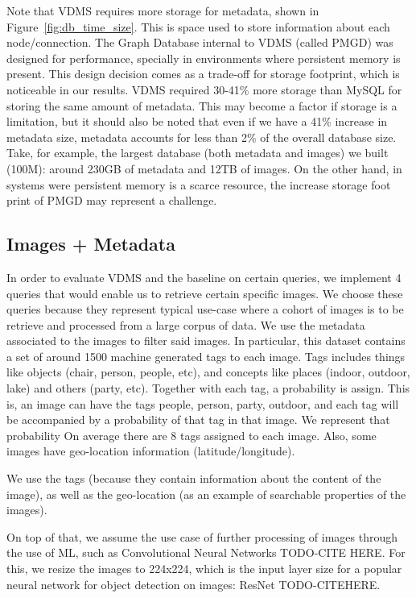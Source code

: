 Note that VDMS requires more storage for metadata, shown in
Figure~\ref{fig:db_time_size}.
This is space used to store information about each node/connection.
The Graph Database internal to VDMS (called PMGD) was designed for performance,
specially in environments where persistent memory is present.
This design decision comes as a trade-off for storage footprint, which is
noticeable in our results.
VDMS required 30-41\% more storage than MySQL for storing the same amount
of metadata.
This may become a factor if storage is a limitation, but it should also be noted
that even if we have a 41\% increase in metadata size,
metadata accounts for less than 2\% of the overall database size.
Take, for example, the largest database (both metadata and images) we built
(100M): around 230GB of metadata and 12TB of images.
On the other hand, in systems were persistent memory is a scarce resource,
the increase storage foot print of PMGD may represent a challenge.


\subsection{Images + Metadata}

In order to evaluate VDMS and the baseline on certain queries, we
implement 4 queries that would enable us to retrieve certain specific images.
We choose these queries because they represent typical use-case where a
cohort of images is to be retrieve and processed from a large corpus of data.
We use the metadata associated to the images to filter said images.
In particular, this dataset contains a set of around 1500 machine generated
tags to each image.
Tags includes things like objects (chair, person, people, etc), and
concepts like places (indoor, outdoor, lake) and others (party, etc).
Together with each tag, a probability is assign.
This is, an image can have the tags people, person, party, outdoor, and each
tag will be accompanied by a probability of that tag in that image.
We represent that probability
On average there are 8 tags assigned to each image.
Also, some images have geo-location information (latitude/longitude).

We use the tags (because they contain information about the content of
the image), as well as the geo-location (as an example of searchable properties
of the images).

On top of that, we assume the use case of further processing of images
through the use of ML, such as Convolutional Neural Networks TODO-CITE HERE.
For this, we resize the images to 224x224, which is the input layer size for
a popular neural network for object detection on images: ResNet TODO-CITEHERE.

